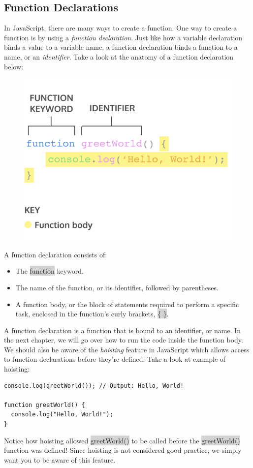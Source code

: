 \documentclass[11pt]{article}
\begin{document}
\subsection{Function Declarations} 
In JavaScript, there are many ways to create a function. One way to create a function is by using a \textit{function declaration}. Just like how a variable declaration binds a value to a variable name, a function declaration binds a function to a name, or an \textit{identifier}. Take a look at the anatomy of a function declaration below:
\vspace{-4mm}
\begin{figure}[H]
\includegraphics[scale = 0.8]{4_1}
\centering
\end{figure}
\vspace{-4mm}
A function declaration consists of: 
\begin{itemize}[leftmargin = *]
\item The \colorbox{lightgray}{function} keyword.
\item The name of the function, or its identifier, followed by parentheses.
\item A function body, or the block of statements required to perform a specific task, enclosed in the function’s curly brackets, \colorbox{lightgray}{\{ \}}.
\end{itemize}
A function declaration is a function that is bound to an identifier, or name. In the next chapter, we will go over how to run the code inside the function body.
We should also be aware of the \textit{hoisting} feature in JavaScript which allows access to function declarations before they’re defined. Take a look at example of hoisting:
\begin{lstlisting}
console.log(greetWorld()); // Output: Hello, World!

function greetWorld() {
  console.log("Hello, World!");
}
\end{lstlisting}
Notice how hoisting allowed \colorbox{lightgray}{greetWorld()} to be called before the \colorbox{lightgray}{greetWorld()} function was defined! Since hoisting is not considered good practice, we simply want you to be aware of this feature.
\end{document}
